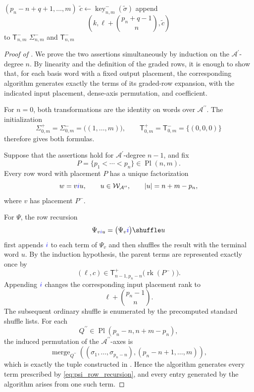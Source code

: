 \documentclass{amsart}
\theoremstyle{definition}
\theoremstyle{remark}
\newcommand{\blue}[1]{{\color{blue}#1}}
\begin{document}
\begin{algorithm}[ht]
\begin{algorithmic}[1]
                    $(p_n-n+q+1,\ldots,m)$
                    \State
                    $\widetilde{c}
                    \gets
                    \operatorname{key}^{-}_{n,m}
                    (\widetilde{\sigma})$
                    \State append
                    \[
                        \left(
                            k,
                            \ell+\binom{p_n+q-1}{n},
                            \widetilde{c}
                        \right)
                    \]
                    to $\mathsf{T}^{-}_{n,m}$
                \EndFor
            \EndFor
        \EndFor
    \EndFor
\EndIf
\State \Return $\Sigma^{-}_{n,m}$ and $\mathsf{T}^{-}_{n,m}$
\end{algorithmic}
\end{algorithm}

\begin{proof}[Proof of ]
We prove the two assertions simultaneously by induction on the
$\mathcal{A}^{\prime}$-degree $n$. By linearity and the definition of the
graded rows, it is enough to show that, for each basis word with a fixed
output placement, the corresponding algorithm generates exactly the terms
of its graded-row expansion, with the indicated input placement,
dense-axis permutation, and coefficient.

For $n=0$, both transformations are the identity on words over
$\mathcal{A}^{\prime\prime}$. The initialization
\[
    \Sigma^{+}_{0,m}
    =
    \Sigma^{-}_{0,m}
    =
    \bigl((1,\ldots,m)\bigr),
    \qquad
    \mathsf{T}^{+}_{0,m}
    =
    \mathsf{T}^{-}_{0,m}
    =
    \{(0,0,0)\}
\]
therefore gives both formulas.

Suppose that the assertions hold for
$\mathcal{A}^{\prime}$-degree $n-1$, and fix
\[
    P=\{p_1<\cdots<p_n\}
    \in
    \operatorname{Pl}(n,m).
\]
Every row word with placement $P$ has a unique factorization
\[
    w
    =
    v\blue{i}u,
    \qquad
    u\in\mathcal{W}_{\mathcal{A}^{\prime\prime}},
    \qquad
    |u|=n+m-p_n,
\]
where $v$ has placement $P^{-}$.

For $\Psi$, the row recursion
\[
    \Psi_{v\blue{i}u}
    =
    \bigl(
        \Psi_v\blue{i}
    \bigr)
    \shuffle u
\]
first appends $\blue{i}$ to each term of $\Psi_v$ and then shuffles the
result with the terminal word $u$. By the induction hypothesis, the parent
terms are represented exactly once by
\[
    (\ell,c)
    \in
    \mathsf{T}^{+}_{n-1,p_n-n}
    \bigl(
        \operatorname{rk}(P^{-})
    \bigr).
\]
Appending $\blue{i}$ changes the corresponding input placement rank to
\[
    \ell+\binom{p_n-1}{n}.
\]
The subsequent ordinary shuffle is enumerated by the precomputed standard
shuffle lists. For each
\[
    Q^{\prime\prime}
    \in
    \operatorname{Pl}(p_n-n,n+m-p_n),
\]
the induced permutation of the
$\mathcal{A}^{\prime\prime}$-axes is
\[
    \operatorname{merge}_{Q^{\prime\prime}}
    \left(
        (\sigma_1,\ldots,\sigma_{p_n-n}),
        (p_n-n+1,\ldots,m)
    \right),
\]
which is exactly the tuple constructed in
. Hence the algorithm generates every term
prescribed by \eqref{eq:psi_row_recursion}, and every entry generated by
the algorithm arises from one such term.


\end{proof}
\end{document}
